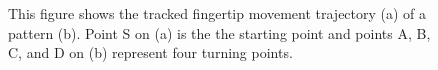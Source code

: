     \begin{figure}[!t]
        \centering
        \hspace{0.2cm}
        \caption{This figure shows the tracked fingertip movement trajectory (a) of a pattern (b). Point S on (a) is the the starting point and points A, B, C, and D on (b) represent four turning points.}
        \label{fig:fig6}
    \end{figure}

